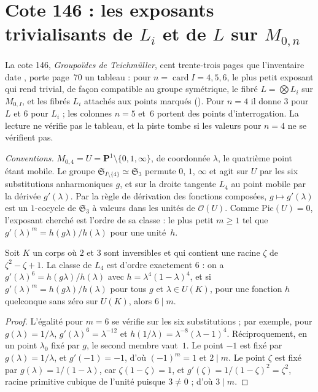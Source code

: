 \section[Cote 146 : les exposants trivialisants de $L_i$ et de $L$ sur $M_{0,n}$]{Cote 146 : les exposants trivialisants de $L_i$ et de $L$ sur $M_{0,n}$\protect{}}\label{sec:146}

La cote 146, \emph{Groupoïdes de Teichmüller}, cent trente-trois pages que l'inventaire date \q{[à partir de 1978]}, porte page~70 un tableau : pour $n = \operatorname{card} I = 4, 5, 6$, le plus petit exposant qui rend trivial, de façon compatible au groupe symétrique, le fibré $L = \bigotimes L_i$ sur $M_{0,I}$, et les fibrés $L_i$ attachés aux points marqués (). Pour $n = 4$ il donne $3$ pour $L$ et $6$ pour $L_i$ ; les colonnes $n = 5$ et~$6$ portent des points d'interrogation. La lecture ne vérifie pas le tableau, et la piste tombe si les valeurs pour $n = 4$ ne se vérifient pas.

\noindent\emph{Conventions.} $M_{0,4} = U = \mathbf P^1 \setminus \{0, 1, \infty\}$, de coordonnée $\lambda$, le quatrième point étant mobile. Le groupe $\mathfrak S_{I \setminus \{4\}} \simeq \mathfrak S_3$ permute $0$, $1$, $\infty$ et agit sur $U$ par les six substitutions anharmoniques $g$, et sur la droite tangente $L_4$ au point mobile par la dérivée $g'(\lambda)$. Par la règle de dérivation des fonctions composées, $g \mapsto g'(\lambda)$ est un $1$-cocycle de $\mathfrak S_3$ à valeurs dans les unités de $\mathcal O(U)$. Comme $\mathrm{Pic}(U) = 0$, l'exposant cherché est l'ordre de sa classe : le plus petit $m \geq 1$ tel que $g'(\lambda)^m = h(g\lambda)/h(\lambda)$ pour une unité~$h$.

\begin{encadre}
\begin{theoreme}[Grothendieck, page 70, colonne $n = 4$, pour $L_4$\piste{146-equivariant-trivialising-exponents}]\label{thm:146-six}
Soit $K$ un corps où $2$ et $3$ sont inversibles et qui contient une racine $\zeta$ de $\zeta^2 - \zeta + 1$. La classe de $L_4$ est d'ordre exactement $6$ : on a $g'(\lambda)^6 = h(g\lambda)/h(\lambda)$ avec $h = \lambda^4(1 - \lambda)^4$, et si $g'(\lambda)^m = h(g\lambda)/h(\lambda)$ pour tous $g$ et $\lambda \in U(K)$, pour une fonction $h$ quelconque sans zéro sur $U(K)$, alors $6 \mid m$.
\end{theoreme}
\end{encadre}

\begin{proof}
L'égalité pour $m = 6$ se vérifie sur les six substitutions ; par exemple, pour $g(\lambda) = 1/\lambda$, $g'(\lambda)^6 = \lambda^{-12}$ et $h(1/\lambda) = \lambda^{-8}(\lambda - 1)^4$. Réciproquement, en un point $\lambda_0$ fixé par $g$, le second membre vaut~$1$. Le point $-1$ est fixé par $g(\lambda) = 1/\lambda$, et $g'(-1) = -1$, d'où $(-1)^m = 1$ et $2 \mid m$. Le point $\zeta$ est fixé par $g(\lambda) = 1/(1 - \lambda)$, car $\zeta(1 - \zeta) = 1$, et $g'(\zeta) = 1/(1 - \zeta)^2 = \zeta^2$, racine primitive cubique de l'unité puisque $3 \neq 0$ ; d'où $3 \mid m$.
\end{proof}

